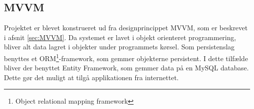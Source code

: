 \subsection{MVVM}
Projektet er blevet konstrueret ud fra designprincippet MVVM, som er beskrevet i afsnit \ref{sec:MVVM}. Da systemet er lavet i objekt orienteret programmering, bliver alt data lagret i objekter under programmets kørsel. Som persistenslag benyttes et ORM\footnote{Object relational mapping framework}-framework, som gemmer objekterne persistent. I dette tilfælde bliver der benyttet Entity Framework, som gemmer data på en MySQL database. Dette gør det muligt at tilgå applikationen fra internettet.